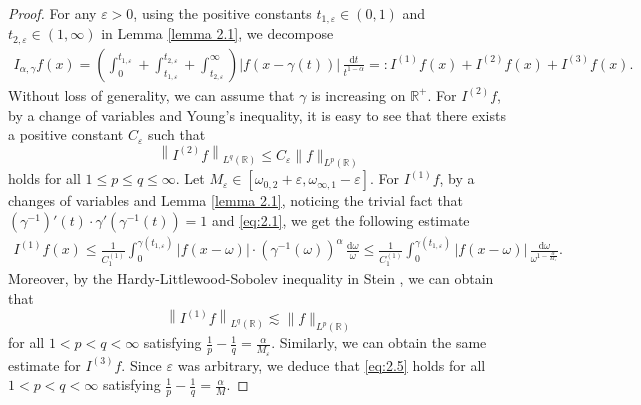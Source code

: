 \documentclass[11pt, twoside, leqno]{article}
\def\ls{\lesssim}
\theoremstyle{definition}
\numberwithin{equation}{section}
\begin{document}
\begin{proof} For any $\varepsilon>0$, using the positive constants $t_{1,\varepsilon}\in(0,1)$ and $t_{2,\varepsilon}\in(1,\infty)$ in Lemma \ref{lemma 2.1}, we decompose
\begin{align*}
I_{\alpha,\gamma}f(x)=\left(\int_{0}^{t_{1,\varepsilon}} + \int_{t_{1,\varepsilon}}^{t_{2,\varepsilon}} + \int_{t_{2,\varepsilon}}^{\infty} \right)\left|f(x-\gamma(t))\right|\,\frac{\textrm{d}t}{t^{1-\alpha}}=:I^{(1)}f(x)+I^{(2)}f(x)+I^{(3)}f(x).
\end{align*}
Without loss of generality, we can assume that $\gamma$ is increasing on $\mathbb{R}^+$. For $I^{(2)}f$, by a change of variables and Young's inequality, it is easy to see that there exists a positive constant $C_{\varepsilon}$ such that $$\left\|I^{(2)}f\right\|_{L^{q}(\mathbb{R})} \leq C_{\varepsilon} \|f\|_{L^{p}(\mathbb{R})}$$ holds for all $1\leq p\leq q\leq \infty$. Let $M_{\varepsilon}\in [\omega_{0,2}+\varepsilon, \omega_{\infty,1}-\varepsilon]$. For $I^{(1)}f$, by a changes of variables and Lemma \ref{lemma 2.1}, noticing the trivial fact that $(\gamma^{-1})'(t)\cdot\gamma'(\gamma^{-1}(t))=1$ and \eqref{eq:2.1}, we get the following estimate
\begin{align*}
I^{(1)}f(x)\leq \frac{1}{C^{(1)}_1} \int_{0}^{\gamma(t_{1,\varepsilon})}|f(x-\omega)|\cdot(\gamma^{-1}(\omega))^{\alpha}\,\frac{\textrm{d}\omega}{\omega} \leq \frac{1}{C^{(1)}_1} \int_{0}^{\gamma(t_{1,\varepsilon})}|f(x-\omega)|\,\frac{\textrm{d}\omega}{\omega^{1-{\frac{\alpha}{M_{\varepsilon}}}}}.
\end{align*}
Moreover, by the Hardy-Littlewood-Sobolev inequality in Stein \cite{S}, we can obtain that $$\left\|I^{(1)}f\right\|_{L^{q}(\mathbb{R})} \ls \|f\|_{L^{p}(\mathbb{R})}$$ for all $1<p<q<\infty$ satisfying $\frac{1}{p}-\frac{1}{q}=\frac{\alpha}{M_{\varepsilon}}$. Similarly, we can obtain the same estimate for $I^{(3)}f$. Since $\varepsilon$ was arbitrary, we deduce that \eqref{eq:2.5} holds for all $1<p<q<\infty$ satisfying $\frac{1}{p}-\frac{1}{q}=\frac{\alpha}{M}$.


\end{proof}
\end{document}
